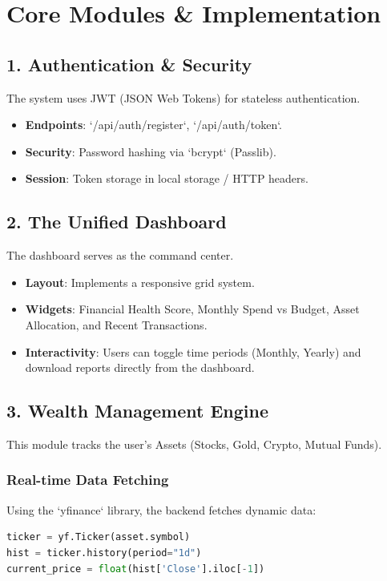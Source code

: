 \documentclass[12pt, a4paper]{report}
\begin{document}
\chapter{Core Modules & Implementation}

\section{1. Authentication & Security}
The system uses JWT (JSON Web Tokens) for stateless authentication.
\begin{itemize}
    \item \textbf{Endpoints}: `/api/auth/register`, `/api/auth/token`.
    \item \textbf{Security}: Password hashing via `bcrypt` (Passlib).
    \item \textbf{Session}: Token storage in local storage / HTTP headers.
\end{itemize}

\section{2. The Unified Dashboard}
The dashboard serves as the command center.
\begin{itemize}
    \item \textbf{Layout}: Implements a responsive grid system.
    \item \textbf{Widgets}: Financial Health Score, Monthly Spend vs Budget, Asset Allocation, and Recent Transactions.
    \item \textbf{Interactivity}: Users can toggle time periods (Monthly, Yearly) and download reports directly from the dashboard.
\end{itemize}

\section{3. Wealth Management Engine}
This module tracks the user's Assets (Stocks, Gold, Crypto, Mutual Funds).
\subsection{Real-time Data Fetching}
Using the `yfinance` library, the backend fetches dynamic data:
\begin{lstlisting}[language=Python]
ticker = yf.Ticker(asset.symbol)
hist = ticker.history(period="1d")
current_price = float(hist['Close'].iloc[-1])
\end{lstlisting}
\end{document}
